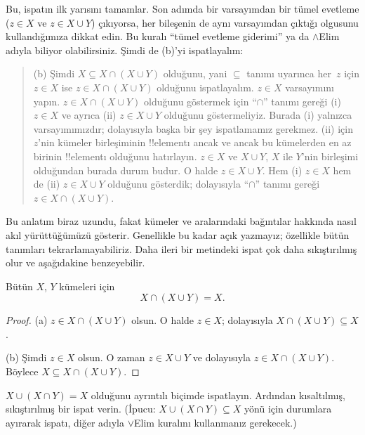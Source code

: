 \begin{explain}
Bu, ispatın ilk yarısını tamamlar. Son adımda bir varsayımdan bir tümel
evetleme ($z \in X$ ve $z \in X \cup Y$) çıkıyorsa, her bileşenin de aynı
varsayımdan çıktığı olgusunu kullandığımıza dikkat edin. Bu kuralı ``tümel
evetleme giderimi'' ya da $\land$Elim adıyla biliyor olabilirsiniz. Şimdi de
(b)'yi ispatlayalım:

\begin{quote}
(b) Şimdi $X \subseteq X \cap (X \cup Y)$ olduğunu, yani $\subseteq$ tanımı
uyarınca her~$z$ için $z \in X$ ise $z \in X \cap (X \cup Y)$ olduğunu
ispatlayalım. $z \in X$ varsayımını yapın. $z \in X \cap (X \cup Y)$
olduğunu göstermek için ``$\cap$'' tanımı gereği (i) $z \in X$ ve ayrıca
(ii) $z \in X \cup Y$ olduğunu göstermeliyiz. Burada (i) yalnızca
varsayımımızdır; dolayısıyla başka bir şey ispatlamamız gerekmez. (ii) için
$z$'nin kümeler birleşiminin !!{element}{}ı ancak ve ancak bu kümelerden en az
birinin !!{element}{}ı olduğunu hatırlayın. $z \in X$ ve $X \cup Y$, $X$ ile
$Y$'nin birleşimi olduğundan burada durum budur. O halde $z \in X \cup Y$.
Hem (i) $z \in X$ hem de (ii) $z \in X \cup Y$ olduğunu gösterdik;
dolayısıyla ``$\cap$'' tanımı gereği $z \in X \cap (X \cup Y)$.
\end{quote}

Bu anlatım biraz uzundu, fakat kümeler ve aralarındaki bağıntılar hakkında
nasıl akıl yürüttüğümüzü gösterir. Genellikle bu kadar açık yazmayız;
özellikle bütün tanımları tekrarlamayabiliriz. Daha ileri bir metindeki ispat
çok daha sıkıştırılmış olur ve aşağıdakine benzeyebilir.
\end{explain}


\begin{prop}[Yutma]
Bütün $X$, $Y$ kümeleri için
\[
X \cap (X \cup Y) = X.
\]
\end{prop}

\begin{proof}
(a) $z \in X \cap (X \cup Y)$ olsun. O halde $z \in X$; dolayısıyla
$X \cap (X \cup Y) \subseteq X$.

(b) Şimdi $z \in X$ olsun. O zaman $z \in X \cup Y$ ve dolayısıyla
$z \in X \cap (X \cup Y)$. Böylece $X \subseteq X \cap (X \cup Y)$.
\end{proof}

\begin{prob}
$X \cup (X \cap Y) = X$ olduğunu ayrıntılı biçimde ispatlayın. Ardından
kısaltılmış, sıkıştırılmış bir ispat verin. (İpucu: $X \cup (X \cap Y)
\subseteq X$ yönü için durumlara ayırarak ispatı, diğer adıyla $\lor$Elim
kuralını kullanmanız gerekecek.)
\end{prob}

